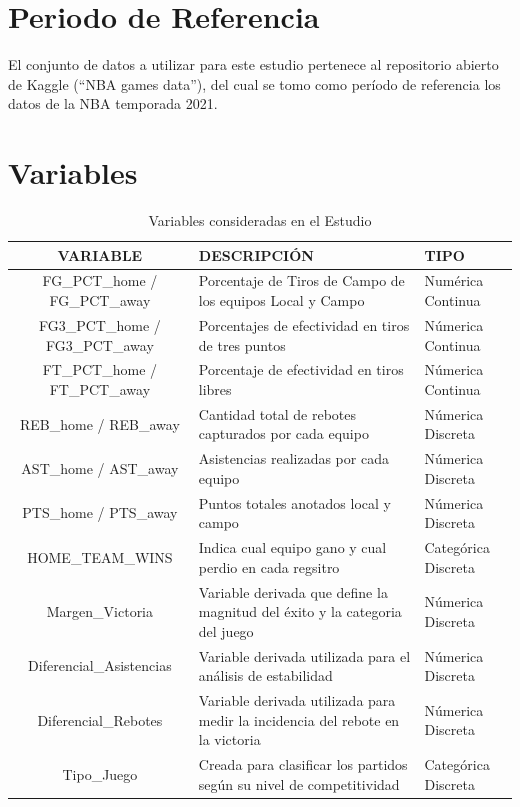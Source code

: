 \documentclass[oneside,11pt]{Latex/Classes/PhDthesisPSnPDF}
\begin{document}
\section{Periodo de Referencia}

El conjunto de datos a utilizar para este estudio pertenece al
repositorio abierto de Kaggle (``NBA games data''), del cual se tomo
como período de referencia los datos de la NBA temporada 2021.\\

\section{Variables}

\begin{table}[ht]
\centering
\caption{Variables consideradas en el Estudio} 
\resizebox{14cm}{!} {
\begin{tabular}{cll}
  \hline
\textbf{VARIABLE} & \textbf{DESCRIPCIÓN} & \textbf{TIPO} \\  
  \hline
  FG\_PCT\_home / FG\_PCT\_away & Porcentaje de Tiros de Campo de los equipos Local y Campo & Numérica Continua\\
  FG3\_PCT\_home / FG3\_PCT\_away & Porcentajes de efectividad en tiros de tres puntos & Númerica Continua\\
  FT\_PCT\_home / FT\_PCT\_away & Porcentaje de efectividad en tiros libres & Númerica Continua\\
  REB\_home / REB\_away & Cantidad total de rebotes capturados por cada equipo & Númerica Discreta\\
  AST\_home / AST\_away & Asistencias realizadas por cada equipo & Númerica Discreta\\
  PTS\_home / PTS\_away & Puntos totales anotados local y campo & Númerica Discreta\\
  HOME\_TEAM\_WINS & Indica cual equipo gano y cual perdio en cada regsitro & Categórica Discreta\\
  Margen\_Victoria & Variable derivada que define la magnitud del éxito y la categoria del juego & Númerica Discreta\\
  Diferencial\_Asistencias & Variable derivada utilizada para el análisis de estabilidad & Númerica Discreta\\
  Diferencial\_Rebotes & Variable derivada utilizada para medir la incidencia del rebote en la victoria & Númerica Discreta\\
  Tipo\_Juego & Creada para clasificar los partidos según su nivel de competitividad & Categórica Discreta\\
   \hline
\end{tabular}
}
\end{table}
\end{document}
